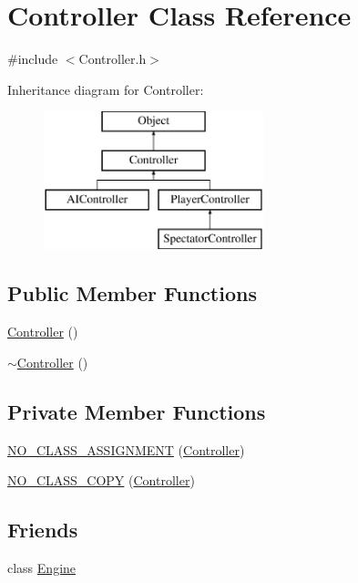 \section{Controller Class Reference}
\label{class_controller}


{\ttfamily \#include $<$Controller.\-h$>$}

Inheritance diagram for Controller\-:\begin{figure}[H]
\begin{center}
\leavevmode
\includegraphics[height=4.000000cm]{class_controller}
\end{center}
\end{figure}
\subsection*{Public Member Functions}
\begin{DoxyCompactItemize}
\item 
\hyperlink{class_controller_a95c56822d667e94b031451729ce069a9}{Controller} ()
\item 
\hyperlink{class_controller_a0ab87934c4f7a266cfdb86e0f36bc1b5}{$\sim$\-Controller} ()
\end{DoxyCompactItemize}
\subsection*{Private Member Functions}
\begin{DoxyCompactItemize}
\item 
\hyperlink{class_controller_aac318e33d568cc375d110d650b6d365b}{N\-O\-\_\-\-C\-L\-A\-S\-S\-\_\-\-A\-S\-S\-I\-G\-N\-M\-E\-N\-T} (\hyperlink{class_controller}{Controller})
\item 
\hyperlink{class_controller_a0fd00eb92186e3623a96bc6209f826f6}{N\-O\-\_\-\-C\-L\-A\-S\-S\-\_\-\-C\-O\-P\-Y} (\hyperlink{class_controller}{Controller})
\end{DoxyCompactItemize}
\subsection*{Friends}
\begin{DoxyCompactItemize}
\item 
class \hyperlink{class_controller_a3e1914489e4bed4f9f23cdeab34a43dc}{Engine}
\end{DoxyCompactItemize}


